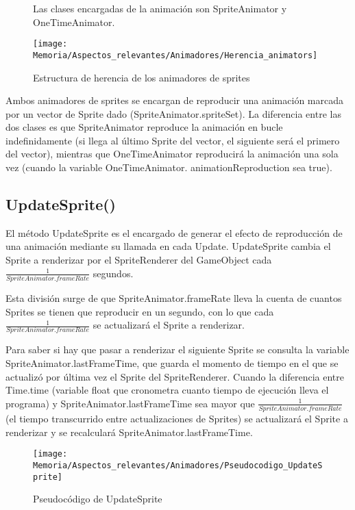 \begin{figure}[h]
Las clases encargadas de la animación son SpriteAnimator y OneTimeAnimator.

\texttt{[image: Memoria/Aspectos\_relevantes/Animadores/Herencia\_animators]}
\caption{Estructura de herencia de los animadores de sprites}
\end{figure}

Ambos animadores de sprites se encargan de reproducir una animación marcada por un vector de Sprite dado (SpriteAnimator.spriteSet). La diferencia entre las dos clases es que SpriteAnimator reproduce la animación en bucle indefinidamente (si llega al último Sprite del vector, el siguiente será el primero del vector), mientras que OneTimeAnimator reproducirá la animación una sola vez (cuando la variable OneTimeAnimator. animationReproduction sea true).

\subsection{UpdateSprite()}
El método UpdateSprite es el encargado de generar el efecto de reproducción de una animación mediante su llamada en cada Update. UpdateSprite cambia el Sprite a renderizar por el SpriteRenderer del GameObject cada $\frac{1}{SpriteAnimator.frameRate}$ segundos.

 
Esta división surge de que SpriteAnimator.frameRate lleva la cuenta de cuantos Sprites se tienen que reproducir en un segundo, con lo que cada $\frac{1}{SpriteAnimator.frameRate}$ se actualizará el Sprite a renderizar.

Para saber si hay que pasar a renderizar el siguiente Sprite se consulta la variable SpriteAnimator.lastFrameTime, que guarda el momento de tiempo en el que se actualizó por última vez el Sprite del SpriteRenderer. Cuando la diferencia entre Time.time (variable float que cronometra cuanto tiempo de ejecución lleva el programa) y SpriteAnimator.lastFrameTime sea mayor que $\frac{1}{SpriteAnimator.frameRate}$ (el tiempo transcurrido entre actualizaciones de Sprites) se actualizará el Sprite a renderizar y se recalculará SpriteAnimator.lastFrameTime.

\begin{figure}[h]
\texttt{[image: Memoria/Aspectos\_relevantes/Animadores/Pseudocodigo\_UpdateSprite]}
\caption{Pseudocódigo de UpdateSprite}
\end{figure}


